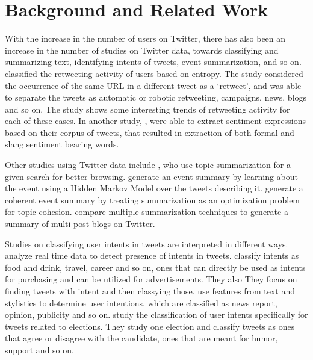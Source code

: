 \section{Background and Related Work}
\label{sec:background}

With the increase in the number of users on Twitter, there has also been an increase in the number of studies on Twitter data, towards classifying and summarizing text, identifying intents of tweets, event summarization, and so on.  classified the retweeting activity of users based on entropy. The study considered the occurrence of the same URL in a different tweet as a ‘retweet’, and was able to separate the tweets as automatic or robotic retweeting, campaigns, news, blogs and so on. The study shows some interesting trends of retweeting activity for each of these cases. In another study, , were able to extract sentiment expressions based on their corpus of tweets, that resulted in extraction of both formal and slang sentiment bearing words.

Other studies using Twitter data include , who use topic summarization for a given search for better browsing.  generate an event summary by learning about the event using a Hidden Markov Model over the tweets describing it.  generate a coherent event summary by treating summarization as an optimization problem for topic cohesion.  compare multiple summarization techniques to generate a summary of multi-post blogs on Twitter.

Studies on classifying user intents in tweets are interpreted in different ways.  analyze real time data to detect presence of intents in tweets.  classify intents as food and drink, travel, career and so on, ones that can directly be used as intents for purchasing and can be utilized for advertisements. They also They focus on finding tweets with intent and then classying those.  use features from text and stylistics to determine user intentions, which are classified as news report, opinion, publicity and so on.  study the classification of user intents specifically for tweets related to elections. They study one election and classify tweets as ones that agree or disagree with the candidate, ones that are meant for humor, support and so on. 

